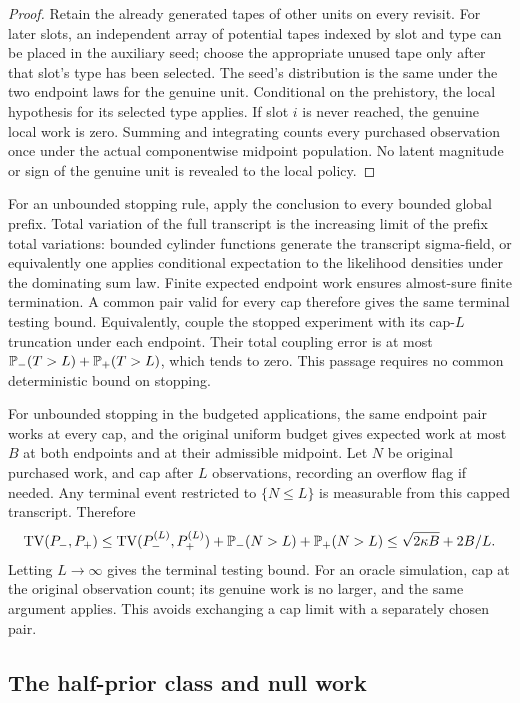 \begin{proof}
Retain the already generated tapes of other units on every revisit.
For later slots, an independent array of potential tapes indexed by slot
and type can be placed in the auxiliary seed; choose the appropriate
unused tape only after that slot's type has been selected. The seed's
distribution is the same under the two endpoint laws for the genuine
unit. Conditional on the prehistory, the local hypothesis for its selected
type applies. If slot $i$ is never reached, the genuine local work is zero.
Summing and integrating counts every purchased observation once under
the actual componentwise midpoint population. No latent magnitude or
sign of the genuine unit is revealed to the local policy.
\end{proof}

For an unbounded stopping rule, apply the conclusion to every bounded
global prefix. Total variation of the full transcript is the increasing
limit of the prefix total variations: bounded cylinder functions generate
the transcript sigma-field, or equivalently one applies conditional
expectation to the likelihood densities under the dominating sum law.
Finite expected endpoint work ensures almost-sure finite termination.
A common pair valid for every cap therefore gives the same terminal
testing bound. Equivalently, couple the stopped experiment with its
cap-$L$ truncation under each endpoint. Their total coupling error is at
most $\mathbb P_-(T>L)+\mathbb P_+(T>L)$, which tends to zero. This passage
requires no common deterministic bound on stopping.

For unbounded stopping in the budgeted applications, the same endpoint pair
works at every cap, and the original uniform budget gives expected work
at most $B$ at both endpoints and at their admissible midpoint. Let $N$
be original purchased work, and cap after $L$ observations, recording an
overflow flag if needed. Any terminal event restricted to $\{N\le L\}$
is measurable from this capped transcript. Therefore
\[
 \operatorname{TV}(P_-,P_+)
 \le\operatorname{TV}(P_-^{(L)},P_+^{(L)})
       +\mathbb P_-(N>L)+\mathbb P_+(N>L)
 \le\sqrt{2\kappa B}+2B/L.
\]
Letting $L\to\infty$ gives the terminal testing bound. For an oracle
simulation, cap at the original observation count; its genuine work
is no larger, and the same argument applies. This avoids exchanging a
cap limit with a separately chosen pair.

\subsection{The half-prior class and null work}

